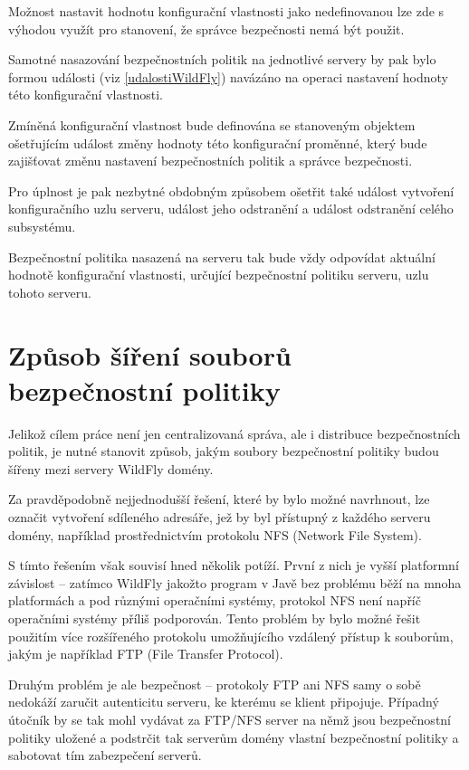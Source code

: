 Možnost nastavit hodnotu konfigurační vlastnosti jako nedefinovanou lze zde s výhodou využít pro stanovení, že správce bezpečnosti nemá být použit.

Samotné nasazování bezpečnostních politik na jednotlivé servery by pak bylo formou události (viz \ref{udalostiWildFly})
navázáno na operaci nastavení hodnoty této konfigurační vlastnosti.

Zmíněná konfigurační vlastnost bude definována se stanoveným objektem ošetřujícím událost změny hodnoty této konfigurační proměnné, který bude zajišťovat
změnu nastavení bezpečnostních politik a správce bezpečnosti.

Pro úplnost je pak nezbytné obdobným způsobem ošetřit také událost vytvoření konfiguračního uzlu serveru, událost jeho odstranění a událost odstranění
celého subsystému.

Bezpečnostní politika nasazená na serveru tak bude vždy odpovídat aktuální hodnotě konfigurační vlastnosti, určující bezpečnostní politiku serveru, uzlu tohoto serveru.

\section{Způsob šíření souborů bezpečnostní politiky} \label{sireniSouboru}

Jelikož cílem práce není jen centralizovaná správa, ale i distribuce bezpečnostních politik, je nutné stanovit způsob, jakým soubory bezpečnostní politiky budou šířeny mezi servery WildFly domény.

Za pravděpodobně nejjednodušší řešení, které by bylo možné navrhnout, lze označit vytvoření sdíleného adresáře, jež by byl přístupný z každého serveru domény, například prostřednictvím protokolu NFS (Network File System).

S tímto řešením však souvisí hned několik potíží.
První z nich je vyšší platformní závislost -- zatímco WildFly jakožto program v Javě bez problému běží na mnoha platformách a pod různými operačními systémy, protokol NFS není napříč operačními systémy příliš podporován.
Tento problém by bylo možné řešit použitím více rozšířeného protokolu umožňujícího vzdálený přístup k souborům, jakým je například FTP (File Transfer Protocol).

Druhým problém je ale bezpečnost -- protokoly FTP ani NFS samy o sobě nedokáží zaručit autenticitu serveru, ke kterému se klient připojuje.
Případný útočník by se tak mohl vydávat za FTP/NFS server na němž jsou bezpečnostní politiky uložené a podstrčit tak serverům domény vlastní bezpečnostní politiky a sabotovat tím zabezpečení serverů.

